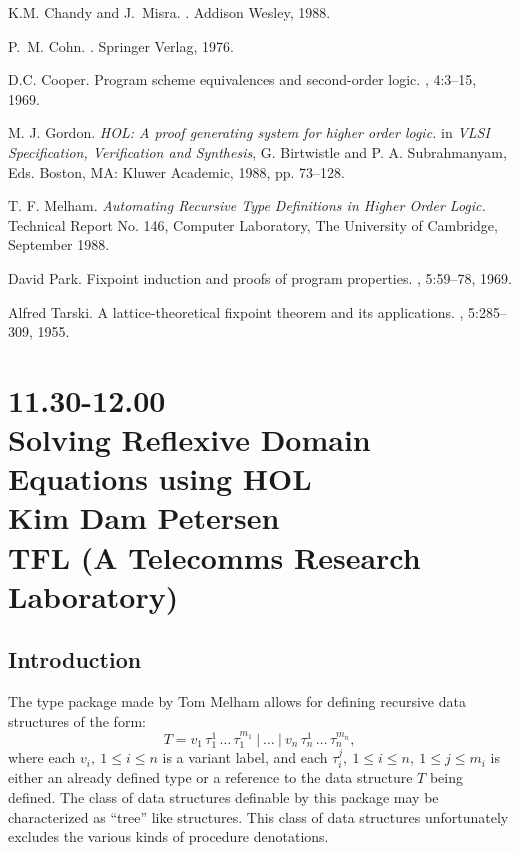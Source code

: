 \begin{thebibliography}{UNITY}

K.M. Chandy and J.~Misra.
.
\newblock Addison Wesley, 1988.

P.~M. Cohn.
.
\newblock Springer Verlag, 1976.

D.C. Cooper.
\newblock Program scheme equivalences and second-order logic.
, 4:3--15, 1969.

M. J. Gordon.
{\em HOL: A proof generating system for higher order logic.}
in {\em VLSI Specification, Verification and Synthesis}, G. Birtwistle
and P. A. Subrahmanyam, Eds. Boston, MA: Kluwer Academic, 1988, pp. 73--128. 

T. F. Melham.
{\em Automating Recursive Type Definitions in Higher Order Logic.}
Technical Report No. 146, Computer Laboratory,
The University of Cambridge, September 1988.

David Park.
\newblock Fixpoint induction and proofs of program properties.
, 5:59--78, 1969.

Alfred Tarski.
\newblock A lattice-theoretical fixpoint theorem and its applications.
, 5:285--309, 1955.

\end{thebibliography}

\newpage
\section*{11.30-12.00\\
Solving Reflexive Domain Equations using HOL\\
Kim Dam Petersen\\
\large\bf TFL (A Telecomms Research Laboratory)}

\subsection*{Introduction}

The type package made by Tom Melham \cite{tfm:type} allows for defining
recursive data structures of the form:
\[ T = v_1 \,\tau_1^1 \,\ldots\, \tau_1^{m_1} \ |\ \ldots
   \ |\ v_n \,\tau_n^1 \,\ldots\, \tau_n^{m_n},
\]
where each \(v_i,\ 1\leq i\leq n\) is a variant label, and each \(\tau_i^j,
\ 1\leq i \leq n,\ 1\leq j \leq m_i\) is either an already defined type or a
reference to the data structure \(T\) being defined.  The class of data
structures definable by this package may be characterized as ``tree'' like
structures.  This class of data structures unfortunately excludes the various
kinds of procedure denotations.

